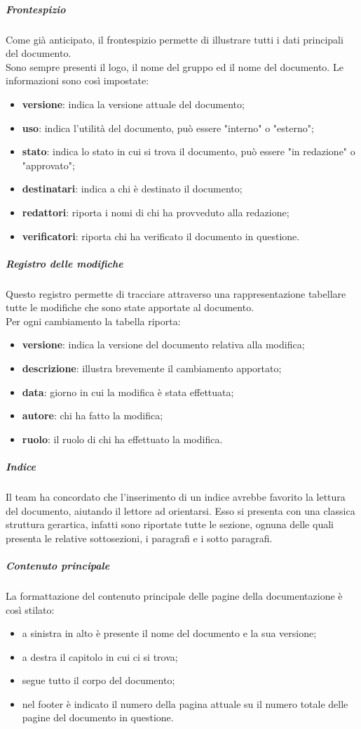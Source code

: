 \subparagraph{Frontespizio}
Come già anticipato, il frontespizio permette di illustrare tutti i dati principali del documento.\\
Sono sempre presenti il logo, il nome del gruppo ed il nome del documento.
Le informazioni sono così impostate:
\begin{itemize}
	\item\textbf{versione}: indica la versione attuale del documento;
	\item\textbf{uso}: indica l'utilità del documento, può essere "interno" o "esterno";
	\item\textbf{stato}: indica lo stato in cui si trova il documento, può essere "in redazione" o "approvato";
	\item\textbf{destinatari}: indica a chi è destinato il documento;
	\item\textbf{redattori}: riporta i nomi di chi ha provveduto alla redazione;
	\item\textbf{verificatori}: riporta chi ha verificato il documento in questione.
\end{itemize}

\subparagraph{Registro delle modifiche}
Questo registro permette di tracciare attraverso una rappresentazione tabellare tutte le modifiche che sono state apportate al documento. \\
Per ogni cambiamento la tabella riporta:
\begin{itemize}
	\item\textbf{versione}: indica la versione del documento relativa alla modifica;
	\item\textbf{descrizione}: illustra brevemente il cambiamento apportato;
	\item\textbf{data}: giorno in cui la modifica è stata effettuata;
	\item\textbf{autore}: chi ha fatto la modifica;
	\item\textbf{ruolo}: il ruolo di chi ha effettuato la modifica.
\end{itemize}

\subparagraph{Indice}
Il team ha concordato che l'inserimento di un indice avrebbe favorito la lettura del documento, aiutando il lettore ad orientarsi.
Esso si presenta con una classica struttura gerartica, infatti sono riportate tutte le sezione, ognuna delle quali presenta le relative sottosezioni, i paragrafi e i sotto paragrafi.

\subparagraph{Contenuto principale}
La formattazione del contenuto principale delle pagine della documentazione è così stilato:
\begin{itemize}
	\item a sinistra in alto è presente il nome del documento e la sua versione;
	\item a destra il capitolo in cui ci si trova;
	\item segue tutto il corpo del documento;
	\item nel footer è indicato il numero della pagina attuale su il numero totale delle pagine del documento in questione. 
\end{itemize}

